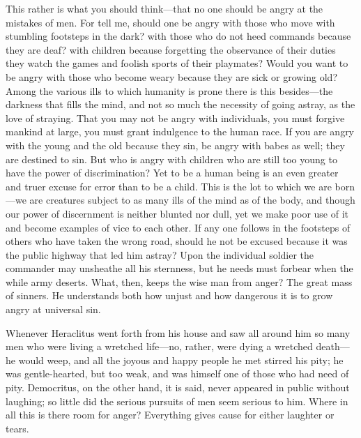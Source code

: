 This rather is what you should think---that no one should be angry at
the mistakes of men. For tell me, should one be angry with those who
move with stumbling footsteps in the dark? with those who do not heed
commands because they are deaf? with children because forgetting the
observance of their duties they watch the games and foolish sports of
their playmates? Would you want to be angry with those who become
weary because they are sick or growing old? Among the various ills to
which humanity is prone there is this be\-sides---the darkness that
fills the mind, and not so much the necessity of going astray, as the
love of straying. That you may not be angry with individuals, you must
forgive mankind at large, you must grant indulgence to the human race.
If you are angry with the young and the old because they sin, be angry
with babes as well; they are destined to sin. But who is angry with
children who are still too young to have the power of discrimination?
Yet to be a human being is an even  greater and truer excuse
for error than to be a child. This is the lot to which we are
born---we are creatures subject to as many ills of the mind as of the
body, and though our power of discernment is neither blunted nor dull,
yet we make poor use of it and become examples of vice to each other.
If any one follows in the footsteps of others who have taken the wrong
road, should he not be excused because it was the public highway that
led him astray? Upon the individual soldier the commander may
unsheathe all his sternness, but he needs must forbear when the while
army deserts. What, then, keeps the wise man from anger? The great
mass of sinners. He understands both how unjust and how dangerous it
is to grow angry at universal sin.

Whenever Heraclitus went forth from his house and saw all around him
so many men who were living a wretched life---no, rather, were dying a
wretched death---he would weep, and all the joyous and happy people he
met stirred his pity; he was gentle-hearted, but too weak, and was
himself one of those who had need of pity. Democritus, on the other
hand, it is said, never appeared in public without laughing; so little
did the serious pursuits of men seem serious to him. Where in all this
is there room for anger? Everything gives cause for either laughter or
tears.

